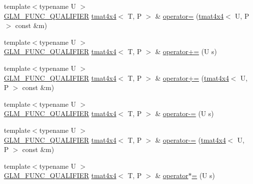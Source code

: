 \begin{DoxyCompactItemize}
{\footnotesize template$<$typename U $>$ }\\\hyperlink{setup_8hpp_a33fdea6f91c5f834105f7415e2a64407}{G\+L\+M\+\_\+\+F\+U\+N\+C\+\_\+\+Q\+U\+A\+L\+I\+F\+I\+ER} \hyperlink{structglm_1_1detail_1_1tmat4x4}{tmat4x4}$<$ T, P $>$ \& \hyperlink{structglm_1_1detail_1_1tmat4x4_a7afed31f7061ff2a5146b9f0c50a8542}{operator=} (\hyperlink{structglm_1_1detail_1_1tmat4x4}{tmat4x4}$<$ U, P $>$ const \&m)
\item 
{\footnotesize template$<$typename U $>$ }\\\hyperlink{setup_8hpp_a33fdea6f91c5f834105f7415e2a64407}{G\+L\+M\+\_\+\+F\+U\+N\+C\+\_\+\+Q\+U\+A\+L\+I\+F\+I\+ER} \hyperlink{structglm_1_1detail_1_1tmat4x4}{tmat4x4}$<$ T, P $>$ \& \hyperlink{structglm_1_1detail_1_1tmat4x4_a6da15355273fb3d106d71e9f97fa5654}{operator+=} (U s)
\item 
{\footnotesize template$<$typename U $>$ }\\\hyperlink{setup_8hpp_a33fdea6f91c5f834105f7415e2a64407}{G\+L\+M\+\_\+\+F\+U\+N\+C\+\_\+\+Q\+U\+A\+L\+I\+F\+I\+ER} \hyperlink{structglm_1_1detail_1_1tmat4x4}{tmat4x4}$<$ T, P $>$ \& \hyperlink{structglm_1_1detail_1_1tmat4x4_a4b8bef58c04e28a9ba1d58375cc6f6b0}{operator+=} (\hyperlink{structglm_1_1detail_1_1tmat4x4}{tmat4x4}$<$ U, P $>$ const \&m)
\item 
{\footnotesize template$<$typename U $>$ }\\\hyperlink{setup_8hpp_a33fdea6f91c5f834105f7415e2a64407}{G\+L\+M\+\_\+\+F\+U\+N\+C\+\_\+\+Q\+U\+A\+L\+I\+F\+I\+ER} \hyperlink{structglm_1_1detail_1_1tmat4x4}{tmat4x4}$<$ T, P $>$ \& \hyperlink{structglm_1_1detail_1_1tmat4x4_ae950a3daa2e47531f7f3763192ebcf5b}{operator-\/=} (U s)
\item 
{\footnotesize template$<$typename U $>$ }\\\hyperlink{setup_8hpp_a33fdea6f91c5f834105f7415e2a64407}{G\+L\+M\+\_\+\+F\+U\+N\+C\+\_\+\+Q\+U\+A\+L\+I\+F\+I\+ER} \hyperlink{structglm_1_1detail_1_1tmat4x4}{tmat4x4}$<$ T, P $>$ \& \hyperlink{structglm_1_1detail_1_1tmat4x4_aeba2224c00c02c2f7eca1b0675a85e70}{operator-\/=} (\hyperlink{structglm_1_1detail_1_1tmat4x4}{tmat4x4}$<$ U, P $>$ const \&m)
\item 
{\footnotesize template$<$typename U $>$ }\\\hyperlink{setup_8hpp_a33fdea6f91c5f834105f7415e2a64407}{G\+L\+M\+\_\+\+F\+U\+N\+C\+\_\+\+Q\+U\+A\+L\+I\+F\+I\+ER} \hyperlink{structglm_1_1detail_1_1tmat4x4}{tmat4x4}$<$ T, P $>$ \& \hyperlink{structglm_1_1detail_1_1tmat4x4_af93523cd38761d56f5e3695085976f57}{operator$\ast$=} (U s)

\end{DoxyCompactItemize}
